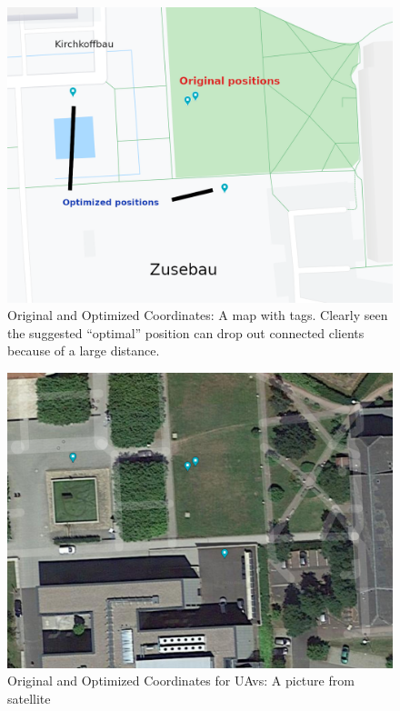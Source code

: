 \begin{figure}[H]
	\centering
	\includegraphics[width=\linewidth,keepaspectratio]{images/Expt4_Result_of_optimization_map_with_names.png}
\caption{Original and Optimized Coordinates: A map with tags. Clearly
seen the suggested ``optimal'' position can drop out connected clients
because of a large distance.}
\end{figure}

\begin{figure}[H]
	\centering
	\includegraphics[width=\linewidth,keepaspectratio]{images/Expt4_Result_of_optimization_sattelite.png}
\caption{Original and Optimized Coordinates for UAvs: A picture from
satellite}
\end{figure}

